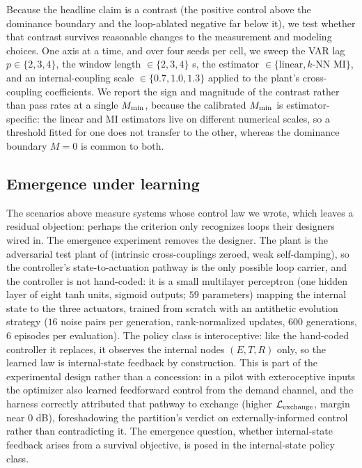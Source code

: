 \documentclass[11pt]{article}
\begin{document}
Because the headline claim is a contrast (the positive control above the dominance boundary and the loop-ablated negative far below it), we test whether that contrast survives reasonable changes to the measurement and modeling choices. One axis at a time, and over four seeds per cell, we sweep the VAR lag $p \in \{2,3,4\}$, the window length $\in \{2,3,4\}$ s, the estimator $\in \{\text{linear}, k\text{-NN MI}\}$, and an internal-coupling scale $\in \{0.7, 1.0, 1.3\}$ applied to the plant's cross-coupling coefficients. We report the sign and magnitude of the contrast rather than pass rates at a single $M_{\min}$, because the calibrated $M_{\min}$ is estimator-specific: the linear and MI estimators live on different numerical scales, so a threshold fitted for one does not transfer to the other, whereas the dominance boundary $M = 0$ is common to both.

\subsection{Emergence under learning}
\label{sec:methods_emergence}

The scenarios above measure systems whose control law we wrote, which leaves a residual objection: perhaps the criterion only recognizes loops their designers wired in. The emergence experiment removes the designer. The plant is the adversarial test plant of  (intrinsic cross-couplings zeroed, weak self-damping), so the controller's state-to-actuation pathway is the only possible loop carrier, and the controller is not hand-coded: it is a small multilayer perceptron (one hidden layer of eight tanh units, sigmoid outputs; $59$ parameters) mapping the internal state to the three actuators, trained from scratch with an antithetic evolution strategy ($16$ noise pairs per generation, rank-normalized updates, $600$ generations, $6$ episodes per evaluation). The policy class is interoceptive: like the hand-coded controller it replaces, it observes the internal nodes $(E, T, R)$ only, so the learned law is internal-state feedback by construction. This is part of the experimental design rather than a concession: in a pilot with exteroceptive inputs the optimizer also learned feedforward control from the demand channel, and the harness correctly attributed that pathway to exchange (higher $\mathcal{L}_{\text{exchange}}$, margin near $0$ dB), foreshadowing the partition's verdict on externally-informed control rather than contradicting it. The emergence question, whether internal-state feedback arises from a survival objective, is posed in the internal-state policy class.
\end{document}
